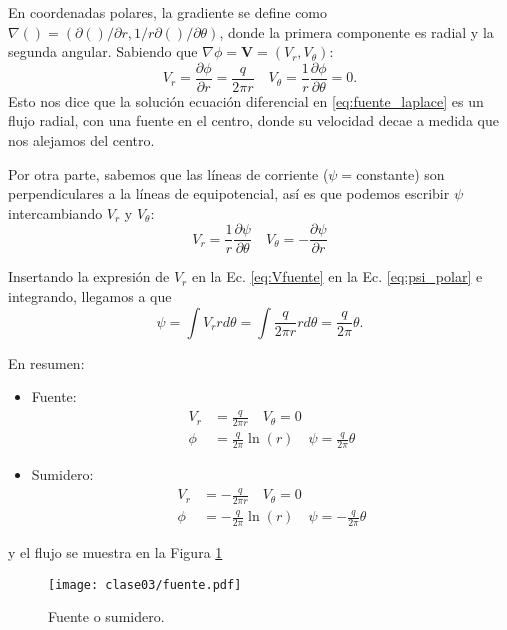 En coordenadas polares, la gradiente se define como $\nabla()=(\partial()/\partial r,1/r\partial()/\partial\theta)$, donde la primera componente es radial y la segunda angular.
Sabiendo que $\nabla\phi=\mathbf{V}=(V_r,V_\theta)$:
%
\begin{equation}\label{eq:Vfuente}
V_r = \frac{\partial\phi}{\partial r} = \frac{q}{2\pi r}\quad V_\theta= \frac{1}{r}\frac{\partial\phi}{\partial\theta}=0.
\end{equation}
%
Esto nos dice que la solución ecuación diferencial en \eqref{eq:fuente_laplace} es un flujo radial, con una fuente en el centro, donde su velocidad decae a medida que nos alejamos del centro.

Por otra parte, sabemos que las líneas de corriente ($\psi=$constante) son perpendiculares a la líneas de equipotencial, así es que podemos escribir $\psi$ intercambiando $V_r$ y $V_\theta$:
\begin{equation}\label{eq:psi_polar}
V_r=\frac{1}{r}\frac{\partial\psi}{\partial\theta} \quad V_\theta=-\frac{\partial\psi}{\partial r}
\end{equation}

Insertando la expresión de $V_r$ en la Ec. \eqref{eq:Vfuente} en la Ec. \eqref{eq:psi_polar} e integrando, llegamos a que
%
\begin{equation}
\psi = \int V_rr d\theta = \int\frac{q}{2\pi r} rd\theta = \frac{q}{2\pi}\theta. 
\end{equation}

En resumen:
\begin{itemize}
\item Fuente:
\begin{align}
V_r &= \frac{q}{2\pi r}\quad V_\theta=0\nonumber\\
\phi&=\frac{q}{2\pi}\ln(r) \quad \psi=\frac{q}{2\pi}\theta
\end{align}
\item Sumidero:
\begin{align}
V_r &= -\frac{q}{2\pi r}\quad V_\theta=0\nonumber\\
\phi&=-\frac{q}{2\pi}\ln(r) \quad \psi=-\frac{q}{2\pi}\theta
\end{align}
\end{itemize}
%
y el flujo se muestra en la Figura \ref{fig:fuente}
%
\begin{figure}[h!]
\centering
\texttt{[image: clase03/fuente.pdf]}
\caption{Fuente o sumidero.}
\label{fig:fuente}
\end{figure}

